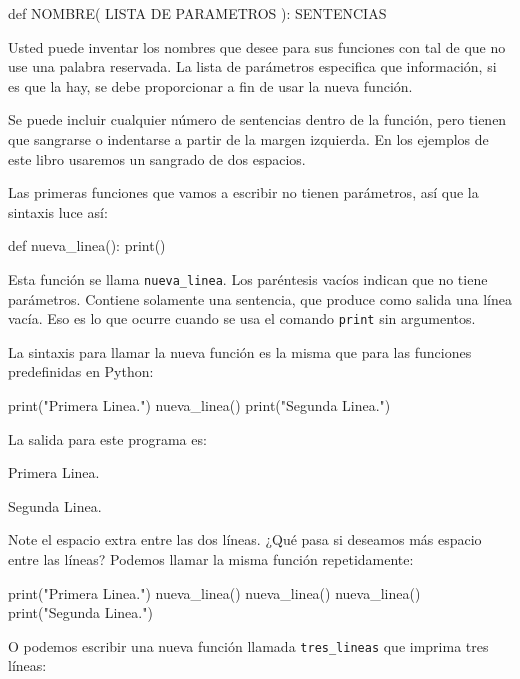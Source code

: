 \beforeverb
\begin{pythoncode}
def NOMBRE( LISTA DE PARAMETROS ):
  SENTENCIAS
\end{pythoncode}
\afterverb
%

Usted puede inventar los nombres que desee para sus funciones con tal de que no 
use una palabra reservada. La lista de parámetros especifica que información, 
si es que la hay, se debe proporcionar a fin de usar la nueva función.

Se puede incluir cualquier número de sentencias dentro de la función, pero
tienen que sangrarse o indentarse a partir de la margen izquierda. En los 
ejemplos de este libro usaremos un sangrado de dos espacios.

Las primeras funciones que vamos a escribir no tienen parámetros, así que la
sintaxis luce así:

\beforeverb
\begin{pythoncode}
def nueva_linea():
  print()
\end{pythoncode}
\afterverb
%

Esta función se llama \texttt{nueva\_linea}.  Los paréntesis vacíos indican que 
no tiene parámetros. Contiene solamente una sentencia, que produce como salida
una línea vacía. Eso es lo que ocurre cuando se usa el comando \texttt{print}
sin argumentos.

La sintaxis para llamar la nueva función es la misma que para las funciones
predefinidas en Python:

\beforeverb
\begin{pythoncode}
print("Primera Linea.")
nueva_linea()
print("Segunda Linea.")
\end{pythoncode}
\afterverb
%

La salida para este programa es:

\beforeverb
\begin{pyconcode}
Primera Linea.

Segunda Linea.
\end{pyconcode}
\afterverb
%

Note el espacio extra entre las dos líneas. ¿Qué pasa si deseamos 
más espacio entre las líneas? Podemos llamar la misma función 
repetidamente:

\beforeverb
\begin{pythoncode}
print("Primera Linea.")
nueva_linea()
nueva_linea()
nueva_linea()
print("Segunda Linea.")
\end{pythoncode}
\afterverb
%

O podemos escribir una nueva función llamada \texttt{tres\_lineas} que imprima
tres líneas:


